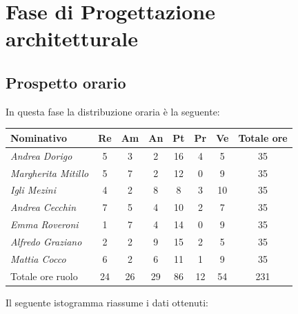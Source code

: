 {{{{\section{Fase di Progettazione architetturale}\label{PreventivoFaseDiProgettazioneArchitetturale}

\subsection{Prospetto orario}\label{PreventivoFaseDiProgettazioneArchitetturaleProspettoOrario}
In questa fase la distribuzione oraria è la seguente:
\quad
\def\tabularxcolumn#1{m{#1}}
{

	\begin{center}
		\renewcommand{\arraystretch}{1.4}
		\begin{tabularx}{\textwidth}{|X|c|c|c|c|c|c|c|}
			\hline
			\rowcolor{airforceblue}
			\textbf{Nominativo} & \textbf{Re} & \textbf{Am} & \textbf{An} & \textbf{Pt} & \textbf{Pr} & \textbf{Ve} & \textbf{Totale ore}\\
			\hline
			\textit{Andrea Dorigo} & 5 & 3 & 2 & 16 & 4 & 5 & 35\\
			\hline
			\textit{Margherita Mitillo} & 5 & 7 & 2 & 12 & 0 & 9 & 35\\
			\hline
			\textit{Igli Mezini} & 4 & 2 & 8 & 8 & 3 & 10 & 35\\
			\hline
			\textit{Andrea Cecchin} & 7 & 5 & 4 & 10 & 2 & 7 & 35\\
			\hline
			\textit{Emma Roveroni} & 1 & 7 & 4 & 14 & 0 & 9 & 35\\
			\hline
			\textit{Alfredo Graziano} & 2 & 2 & 9 & 15 & 2 & 5 & 35\\
			\hline
			\textit{Mattia Cocco} & 6 & 2 & 6 & 11 & 1 & 9 & 35\\
			\hline
			Totale ore ruolo & 24 & 26 & 29 & 86 & 12 & 54 & 231\\
			\hline
		\end{tabularx}
	\end{center}

Il seguente istogramma riassume i dati ottenuti:

}}}}}
